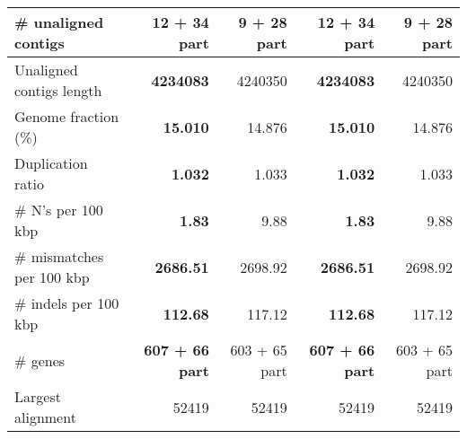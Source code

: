 \documentclass[12pt,a4paper]{article}
\begin{document}
\begin{table}[ht]
\begin{center}
\begin{tabular}{|l*{4}{|r}|}
\# unaligned contigs & {\bf 12 + 34 part} & 9 + 28 part & {\bf 12 + 34 part} & 9 + 28 part \\ \hline
Unaligned contigs length & {\bf 4234083} & 4240350 & {\bf 4234083} & 4240350 \\ \hline
Genome fraction (\%) & {\bf 15.010} & 14.876 & {\bf 15.010} & 14.876 \\ \hline
Duplication ratio & {\bf 1.032} & 1.033 & {\bf 1.032} & 1.033 \\ \hline
\# N's per 100 kbp & {\bf 1.83} & 9.88 & {\bf 1.83} & 9.88 \\ \hline
\# mismatches per 100 kbp & {\bf 2686.51} & 2698.92 & {\bf 2686.51} & 2698.92 \\ \hline
\# indels per 100 kbp & {\bf 112.68} & 117.12 & {\bf 112.68} & 117.12 \\ \hline
\# genes & {\bf 607 + 66 part} & 603 + 65 part & {\bf 607 + 66 part} & 603 + 65 part \\ \hline
Largest alignment & 52419 & 52419 & 52419 & 52419 \\ \hline
\end{tabular}
\end{center}
\end{table}
\end{document}
